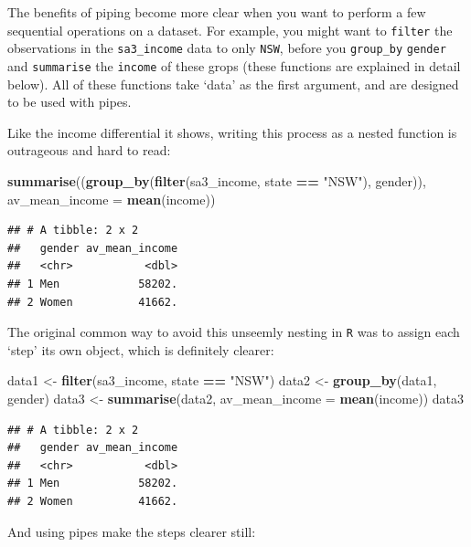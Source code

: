\documentclass[]{book}
\newenvironment{Shaded}{\begin{snugshade}}{\end{snugshade}}
\newcommand{\DataTypeTok}[1]{\textcolor[rgb]{0.13,0.29,0.53}{#1}}
\newcommand{\KeywordTok}[1]{\textcolor[rgb]{0.13,0.29,0.53}{\textbf{#1}}}
\newcommand{\NormalTok}[1]{#1}
\newcommand{\OperatorTok}[1]{\textcolor[rgb]{0.81,0.36,0.00}{\textbf{#1}}}
\newcommand{\StringTok}[1]{\textcolor[rgb]{0.31,0.60,0.02}{#1}}
\begin{document}
The benefits of piping become more clear when you want to perform a few sequential operations on a dataset. For example, you might want to \texttt{filter} the observations in the \texttt{sa3\_income} data to only \texttt{NSW}, before you \texttt{group\_by} \texttt{gender} and \texttt{summarise} the \texttt{income} of these grops (these functions are explained in detail below). All of these functions take `data' as the first argument, and are designed to be used with pipes.

Like the income differential it shows, writing this process as a nested function is outrageous and hard to read:

\begin{Shaded}
\begin{Highlighting}[]
\KeywordTok{summarise}\NormalTok{((}\KeywordTok{group_by}\NormalTok{(}\KeywordTok{filter}\NormalTok{(sa3_income, state }\OperatorTok{==}\StringTok{ "NSW"}\NormalTok{), gender)), }\DataTypeTok{av_mean_income =} \KeywordTok{mean}\NormalTok{(income))}
\end{Highlighting}
\end{Shaded}

\begin{verbatim}
## # A tibble: 2 x 2
##   gender av_mean_income
##   <chr>           <dbl>
## 1 Men            58202.
## 2 Women          41662.
\end{verbatim}

The original common way to avoid this unseemly nesting in \texttt{R} was to assign each `step' its own object, which is definitely clearer:

\begin{Shaded}
\begin{Highlighting}[]
\NormalTok{data1 <-}\StringTok{ }\KeywordTok{filter}\NormalTok{(sa3_income, state }\OperatorTok{==}\StringTok{ "NSW"}\NormalTok{)}
\NormalTok{data2 <-}\StringTok{ }\KeywordTok{group_by}\NormalTok{(data1, gender)}
\NormalTok{data3 <-}\StringTok{ }\KeywordTok{summarise}\NormalTok{(data2, }\DataTypeTok{av_mean_income =} \KeywordTok{mean}\NormalTok{(income))}
\NormalTok{data3}
\end{Highlighting}
\end{Shaded}

\begin{verbatim}
## # A tibble: 2 x 2
##   gender av_mean_income
##   <chr>           <dbl>
## 1 Men            58202.
## 2 Women          41662.
\end{verbatim}

And using pipes make the steps clearer still:
\end{document}
